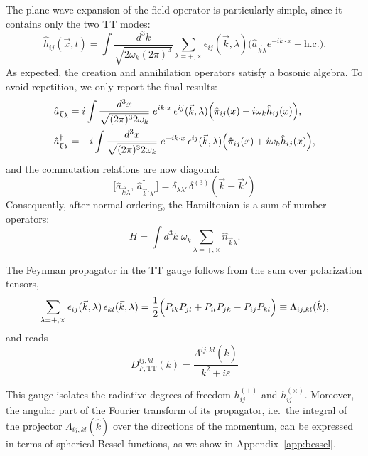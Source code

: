 \documentclass[12pt,a4paper,oneside]{article}
\numberwithin{equation}{section}   %
\begin{document}
The plane-wave expansion of the field operator is particularly simple, since it
contains only the two TT modes:
\begin{equation}
    \label{hTT}
    \hat{h}_{ij}(\vec{x},t)= \int \frac{d^3k}{\sqrt{2\omega_k(2\pi)^3}}
    \sum_{\lambda=+,\times}
    \epsilon_{ij}(\vec{k},\lambda)\bigl(\hat{a}_{\vec k\lambda}e^{-ik\cdot x}+\text{h.c.}\bigr) .
\end{equation}
As expected, the creation and annihilation operators satisfy a bosonic algebra.
To avoid repetition, we only report the final results:
\begin{align}
    \hat{a}_{\vec{k}\lambda} &= i \int \frac{d^3x}{\sqrt{(2\pi)^3 2\omega_k}} \;
    e^{ik\cdot x}\, \epsilon^{ij}(\vec k,\lambda)
    \Bigl(\hat{\pi}_{ij}(x) - i\omega_k \hat{h}_{ij}(x)\Bigr),\\
    \hat{a}^{\dagger}_{\vec{k}\lambda} &= -i \int \frac{d^3x}{\sqrt{(2\pi)^3 2\omega_k}} \;
    e^{-ik\cdot x}\, \epsilon^{ij}(\vec k,\lambda)
    \Bigl(\hat{\pi}_{ij}(x) + i\omega_k \hat{h}_{ij}(x)\Bigr),
\end{align}
and the commutation relations are now diagonal:
\begin{equation}
    \boxed{ \bigl[\hat{a}_{\vec k\lambda},\, \hat{a}^{\dagger}_{\vec k'\lambda'}\bigr]
    = \delta_{\lambda\lambda'}\,\delta^{(3)}(\vec{k}-\vec{k}') }
\end{equation}
Consequently, after normal ordering, the Hamiltonian is a sum of number
operators:
\begin{equation}
    H = \int d^3k\; \omega_k \sum_{\lambda=+,\times} \hat{n}_{\vec k\lambda} .
\end{equation}

The Feynman propagator in the TT gauge follows from the sum over polarization
tensors,
\begin{equation}
    \sum_{\lambda=+, \times} \epsilon_{ij}(\vec{k},\lambda)\,\epsilon_{kl}(\vec{k},\lambda)
    = \frac{1}{2}\Bigl(P_{ik}P_{jl} + P_{il}P_{jk} - P_{ij}P_{kl}\Bigr)
    \equiv \Lambda_{ij,kl}(\hat{k}),
\end{equation}
and reads
\begin{equation}
    \boxed{ D_{F, \text{TT}}^{ij,kl}(k) = \frac{\Lambda^{ij,kl}(\hat{k})}{k^2  + i\varepsilon} }
\end{equation}

This gauge isolates the radiative degrees of freedom
$h_{ij}^{(+)}$ and $h_{ij}^{(\times)}$. Moreover, the angular part of the
Fourier transform of its propagator, i.e.\ the integral of the projector
$\Lambda_{ij,kl}(\hat k)$ over the directions of the momentum, can be expressed
in terms of spherical Bessel functions, as we show in
Appendix~\ref{app:bessel}.
\end{document}
